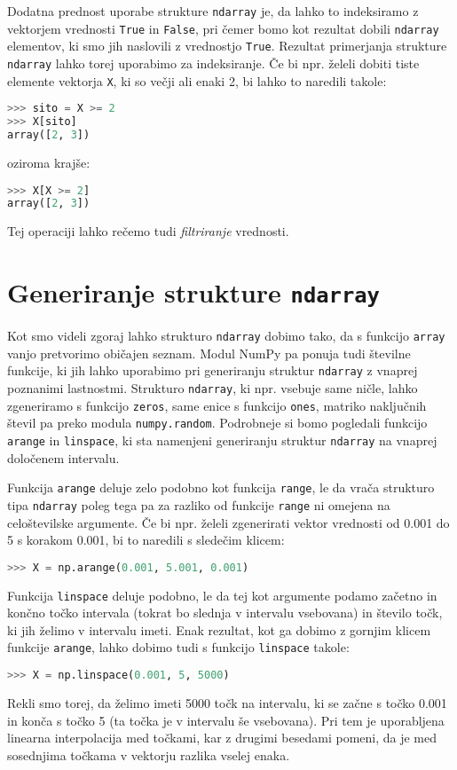 Dodatna prednost uporabe strukture \texttt{ndarray} je, da lahko to indeksiramo z vektorjem vrednosti \texttt{True} in \texttt{False}, pri čemer bomo kot rezultat dobili \texttt{ndarray} elementov, ki smo jih naslovili z vrednostjo \texttt{True}. Rezultat primerjanja strukture \texttt{ndarray} lahko torej uporabimo za indeksiranje. Če bi npr. želeli dobiti tiste elemente vektorja \texttt{X}, ki so večji ali enaki 2, bi lahko to naredili takole:
\begin{lstlisting}[language=Python]
>>> sito = X >= 2
>>> X[sito]
array([2, 3])
\end{lstlisting}
oziroma krajše:
\begin{lstlisting}[language=Python]
>>> X[X >= 2]
array([2, 3])
\end{lstlisting}
Tej operaciji lahko rečemo tudi \emph{filtriranje} vrednosti.

\section{Generiranje strukture \texttt{ndarray}}

Kot smo videli zgoraj lahko strukturo \texttt{ndarray} dobimo tako, da s funkcijo \texttt{array} vanjo pretvorimo običajen seznam. Modul NumPy pa ponuja tudi številne funkcije, ki jih lahko uporabimo pri generiranju  struktur \texttt{ndarray} z vnaprej poznanimi lastnostmi. Strukturo \texttt{ndarray}, ki npr. vsebuje same ničle, lahko zgeneriramo s funkcijo \texttt{zeros}, same enice s funkcijo \texttt{ones}, matriko naključnih števil pa preko modula \texttt{numpy.random}. Podrobneje si bomo pogledali funkcijo \texttt{arange} in \texttt{linspace}, ki sta namenjeni generiranju struktur \texttt{ndarray} na vnaprej določenem intervalu.

Funkcija \texttt{arange} deluje zelo podobno kot funkcija \texttt{range}, le da vrača strukturo tipa \texttt{ndarray} poleg tega pa za razliko od funkcije \texttt{range} ni omejena na celoštevilske argumente. Če bi npr. želeli zgenerirati vektor vrednosti od 0.001 do 5 s korakom 0.001, bi to naredili s sledečim klicem:
\begin{lstlisting}[language=Python]
>>> X = np.arange(0.001, 5.001, 0.001)
\end{lstlisting}
Funkcija \texttt{linspace} deluje podobno, le da tej kot argumente podamo začetno in končno točko intervala (tokrat bo slednja v intervalu vsebovana) in število točk, ki jih želimo v intervalu imeti. Enak rezultat, kot ga dobimo z gornjim klicem funkcije \texttt{arange}, lahko dobimo tudi s funkcijo \texttt{linspace} takole:
\begin{lstlisting}[language=Python]
>>> X = np.linspace(0.001, 5, 5000)
\end{lstlisting}
Rekli smo torej, da želimo imeti 5000 točk na intervalu, ki se začne s točko 0.001 in konča s točko 5 (ta točka je v intervalu še vsebovana). Pri tem je uporabljena linearna interpolacija med točkami, kar z drugimi besedami pomeni, da je med sosednjima točkama v vektorju razlika vselej enaka.


